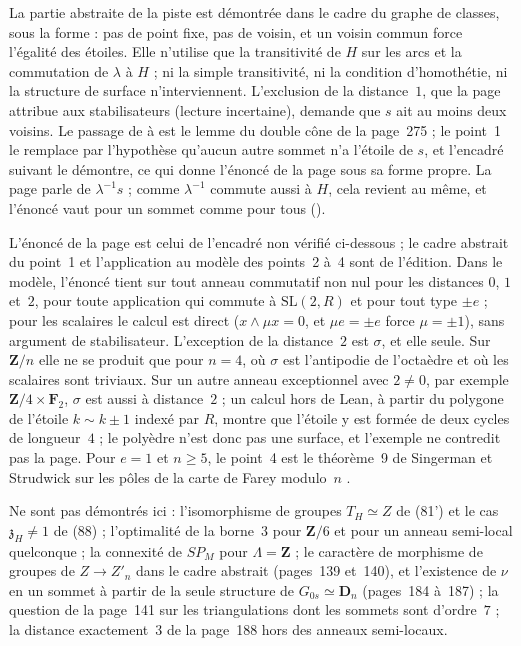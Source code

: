 \begin{remarque}
La partie abstraite de la piste est démontrée dans le cadre du graphe de classes, sous la forme : pas de point fixe, pas de voisin, et un voisin commun force l'égalité des étoiles. Elle n'utilise que la transitivité de $H$ sur les arcs et la commutation de $\lambda$ à $H$ ; ni la simple transitivité, ni la condition d'homothétie, ni la structure de surface n'interviennent. L'exclusion de la distance~$1$, que la page attribue aux stabilisateurs (lecture incertaine), demande que $s$ ait au moins deux voisins. Le passage de  à  est le lemme du double cône de la page~275 ; le point~1 le remplace par l'hypothèse qu'aucun autre sommet n'a l'étoile de $s$, et l'encadré suivant le démontre, ce qui donne l'énoncé de la page sous sa forme propre. La page parle de $\lambda^{-1}s$ ; comme $\lambda^{-1}$ commute aussi à $H$, cela revient au même, et l'énoncé vaut pour un sommet comme pour tous ().

L'énoncé de la page est celui de l'encadré non vérifié ci-dessous ; le cadre abstrait du point~1 et l'application au modèle des points~2 à~4 sont de l'édition. Dans le modèle, l'énoncé tient sur tout anneau commutatif non nul pour les distances $0$, $1$ et~$2$, pour toute application qui commute à $\mathrm{SL}(2, R)$ et pour tout type $\pm e$ ; pour les scalaires le calcul est direct ($x \wedge \mu x = 0$, et $\mu e = \pm e$ force $\mu = \pm 1$), sans argument de stabilisateur. L'exception de la distance~$2$ est $\sigma$, et elle seule. Sur $\mathbf Z/n$ elle ne se produit que pour $n = 4$, où $\sigma$ est l'antipodie de l'octaèdre et où les scalaires sont triviaux. Sur un autre anneau exceptionnel avec $2 \neq 0$, par exemple $\mathbf Z/4 \times \mathbf F_2$, $\sigma$ est aussi à distance~$2$ ; un calcul hors de Lean, à partir du polygone de l'étoile $k \sim k \pm 1$ indexé par $R$, montre que l'étoile y est formée de deux cycles de longueur~$4$ ; le polyèdre n'est donc pas une surface, et l'exemple ne contredit pas la page. Pour $e = 1$ et $n \geq 5$, le point~4 est le théorème~9 de Singerman et Strudwick sur les pôles de la carte de Farey modulo~$n$ \cite{singermanstrudwick2020}.
\end{remarque}

Ne sont pas démontrés ici : l'isomorphisme de groupes $T_H \simeq Z$ de (81') et le cas $\mathfrak z_H \neq 1$ de (88) ; l'optimalité de la borne~$3$ pour $\mathbf Z/6$ et pour un anneau semi-local quelconque ; la connexité de $SP_M$ pour $\Lambda = \mathbf Z$ ; le caractère de morphisme de groupes de $Z \to Z'_n$ dans le cadre abstrait (pages~139 et~140), et l'existence de $\nu$ en un sommet à partir de la seule structure de $G_{0s} \simeq \mathbf D_n$ (pages~184 à~187) ; la question de la page~141 sur les triangulations dont les sommets sont d'ordre~$7$ ; la distance exactement~$3$ de la page~188 hors des anneaux semi-locaux.

